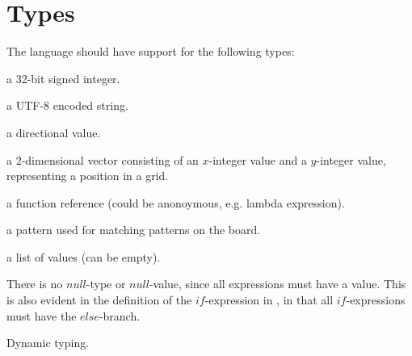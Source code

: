 \section{Types}

The language should have support for the following types:

\begin{description}[noitemsep]
\item[Integer] a 32-bit signed integer.
\item[String] a UTF-8 encoded string.
\item[Direction] a directional value.
\item[Coordinate] a 2-dimensional vector consisting of an $x$-integer value and
a $y$-integer value, representing a position in a grid.
\item[Function] a function reference (could be anonoymous, e.g. lambda expression).
\item[Pattern] a pattern used for matching patterns on the board.
\item[List] a list of values (can be empty).
\item[Action]
\end{description}

There is no $null$-type or $null$-value, since all expressions must have a value. This
is also evident in the definition of the $if$-expression in , in that
all $if$-expressions must have the $else$-branch.

Dynamic typing.



